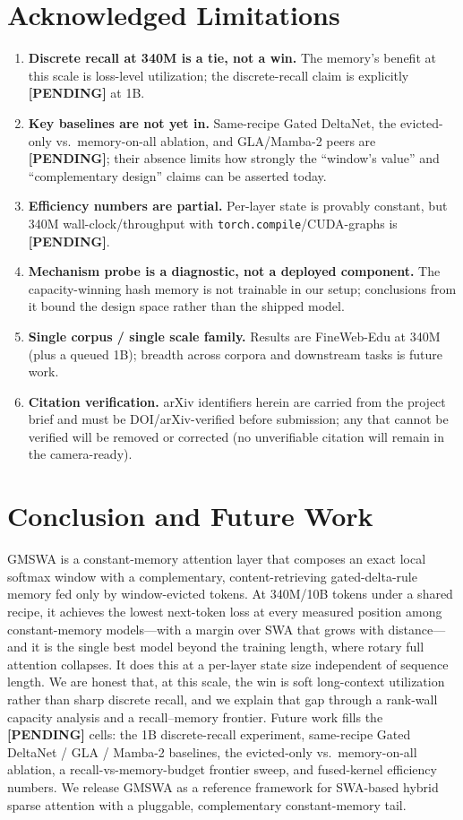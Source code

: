 \documentclass[letterpaper]{article} %
\newcommand{\pending}{\textbf{[PENDING]}}
\begin{document}
\section{Acknowledged Limitations}
\begin{enumerate}
  \item \textbf{Discrete recall at 340M is a tie, not a win.} The memory's benefit at this scale is loss-level utilization; the discrete-recall claim is explicitly \pending{} at 1B.
  \item \textbf{Key baselines are not yet in.} Same-recipe Gated DeltaNet, the evicted-only vs.\ memory-on-all ablation, and GLA/Mamba-2 peers are \pending{}; their absence limits how strongly the ``window's value'' and ``complementary design'' claims can be asserted today.
  \item \textbf{Efficiency numbers are partial.} Per-layer state is provably constant, but 340M wall-clock/throughput with \texttt{torch.compile}/CUDA-graphs is \pending{}.
  \item \textbf{Mechanism probe is a diagnostic, not a deployed component.} The capacity-winning hash memory is not trainable in our setup; conclusions from it bound the design space rather than the shipped model.
  \item \textbf{Single corpus / single scale family.} Results are FineWeb-Edu at 340M (plus a queued 1B); breadth across corpora and downstream tasks is future work.
  \item \textbf{Citation verification.} arXiv identifiers herein are carried from the project brief and must be DOI/arXiv-verified before submission; any that cannot be verified will be removed or corrected (no unverifiable citation will remain in the camera-ready).
\end{enumerate}

\section{Conclusion and Future Work}
GMSWA is a constant-memory attention layer that composes an exact local softmax window with a complementary, content-retrieving gated-delta-rule memory fed only by window-evicted tokens. At 340M/10B tokens under a shared recipe, it achieves the lowest next-token loss at every measured position among constant-memory models---with a margin over SWA that grows with distance---and it is the single best model beyond the training length, where rotary full attention collapses. It does this at a per-layer state size independent of sequence length. We are honest that, at this scale, the win is soft long-context utilization rather than sharp discrete recall, and we explain that gap through a rank-wall capacity analysis and a recall--memory frontier. Future work fills the \pending{} cells: the 1B discrete-recall experiment, same-recipe Gated DeltaNet / GLA / Mamba-2 baselines, the evicted-only vs.\ memory-on-all ablation, a recall-vs-memory-budget frontier sweep, and fused-kernel efficiency numbers. We release GMSWA as a reference framework for SWA-based hybrid sparse attention with a pluggable, complementary constant-memory tail.
\end{document}
